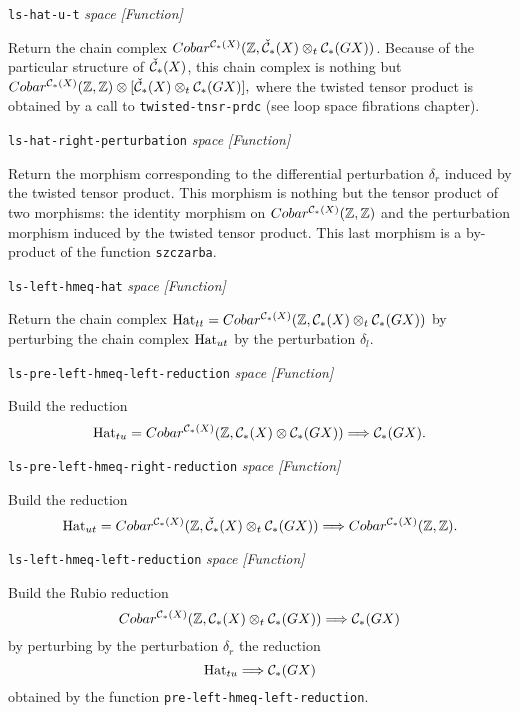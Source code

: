 {{{\tt ls-hat-u-t} {\em space}  \hfill {\em [Function]} \par}
{\leftskip=15mm
Return the chain complex
$Cobar^{{\cal C}_*(X)}({\mathbb{Z}},{\check{\cal C}}_*(X)\otimes_t {\cal C_*}(GX))$. Because of
the particular structure of ${\check{\cal C}}_*(X)$, this chain complex is nothing but
$Cobar^{{\cal C}_*(X)}({\mathbb{Z}},{\mathbb{Z}})\otimes[{\check{\cal C}}_*(X)\otimes_t {\cal C_*}(GX)],$
where the twisted tensor product is obtained by a call to {\tt twisted-tnsr-prdc}
(see loop space fibrations chapter). \par}
{\leftskip=5mm
{\tt ls-hat-right-perturbation} {\em space}  \hfill {\em [Function]} \par}
{\leftskip=15mm
Return the morphism corresponding to the differential perturbation $\delta_r$ induced
by the twisted tensor product. This morphism is nothing but the tensor product of two
morphisms: the identity morphism on $Cobar^{{\cal C}_*(X)}({\mathbb{Z}},{\mathbb{Z}})$ and
the perturbation morphism induced by the twisted tensor product. This last
morphism is a by-product of the function {\tt szczarba}. \par}
{\leftskip=5mm
{\tt ls-left-hmeq-hat} {\em space}  \hfill {\em [Function]} \par}
{\leftskip=15mm
Return the chain complex
${\rm Hat}_{tt}=Cobar^{{\cal C}_*(X)}({\mathbb{Z}}, {\cal C}_*(X)\otimes_t {\cal C_*}(GX))$ by
perturbing the chain complex ${\rm Hat}_{ut}$ by the perturbation $\delta_l$. \par}
{\leftskip=5mm
{\tt ls-pre-left-hmeq-left-reduction} {\em space}  \hfill {\em [Function]} \par}
{\leftskip=15mm
Build the reduction
$${\rm Hat}_{tu}=Cobar^{{\cal C}_*(X)}({\mathbb{Z}}, {\cal C}_*(X)\otimes {\cal C_*}(GX)) \Longrightarrow {\cal C}_*(GX).$$
\par}
{\leftskip=5mm
{\tt ls-pre-left-hmeq-right-reduction} {\em space}  \hfill {\em [Function]} \par}
{\leftskip=15mm
Build the reduction
$${\rm Hat}_{ut}=Cobar^{{\cal C}_*(X)}({\mathbb{Z}},{\check{\cal C}}_*(X)\otimes_t {\cal C_*}(GX)) \Longrightarrow
Cobar^{{\cal C}_*(X)}({\mathbb{Z}}, {\mathbb{Z}}).$$ \par}
{\leftskip=5mm
{\tt ls-left-hmeq-left-reduction} {\em space}  \hfill {\em [Function]} \par}
{\leftskip=15mm
Build the Rubio reduction
$$Cobar^{{\cal C}_*(X)}({\mathbb{Z}}, {\cal C}_*(X)\otimes_t {\cal C_*}(GX)) \Longrightarrow{\cal C}_*(GX)$$
by perturbing by the perturbation $\delta_r$ the reduction
$${\rm Hat}_{tu} \Longrightarrow {\cal C}_*(GX)$$
obtained by the function {\tt pre-left-hmeq-left-reduction}. \par}
}
